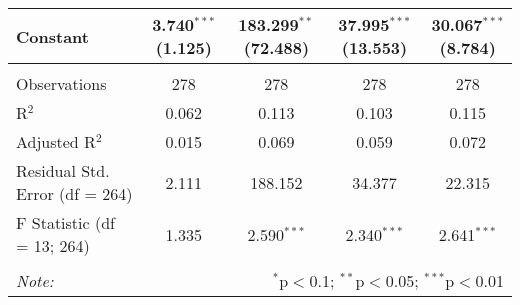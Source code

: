 \begin{table}[H]
\begin{tabular}{@{\extracolsep{5pt}}lcccc}
  Constant & 3.740$^{***}$ (1.125) & 183.299$^{**}$ (72.488) & 37.995$^{***}$ (13.553) & 30.067$^{***}$ (8.784) \\ 
 \hline \\[-1.8ex] 
Observations & 278 & 278 & 278 & 278 \\ 
R$^{2}$ & 0.062 & 0.113 & 0.103 & 0.115 \\ 
Adjusted R$^{2}$ & 0.015 & 0.069 & 0.059 & 0.072 \\ 
Residual Std. Error (df = 264) & 2.111 & 188.152 & 34.377 & 22.315 \\ 
F Statistic (df = 13; 264) & 1.335 & 2.590$^{***}$ & 2.340$^{***}$ & 2.641$^{***}$ \\ 
\hline 
\hline \\[-1.8ex] 
\textit{Note:}  & \multicolumn{4}{r}{$^{*}$p$<$0.1; $^{**}$p$<$0.05; $^{***}$p$<$0.01} \\ 
\end{tabular} 
\end{table} 
